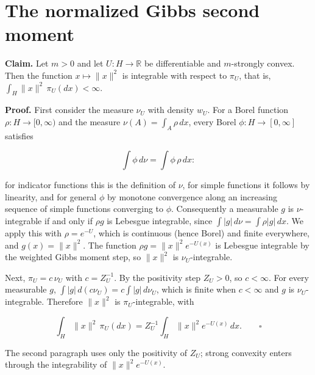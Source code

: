 \documentclass[11pt,a4paper]{article}
\begin{document}
\section{\texorpdfstring{The normalized Gibbs second moment}{The normalized Gibbs second moment}}


\textbf{Claim.} Let \(m>0\) and let \(U:H\to\mathbb R\) be differentiable and \(m\)-strongly convex. Then the function \(x\mapsto\|x\|^2\) is integrable with respect to \(\pi_U\), that is, \(\int_H\|x\|^2\,\pi_U(dx)<\infty\).




\textbf{Proof.} First consider the measure \(\nu_U\) with density \(w_U\). For a Borel function \(\rho:H\to[0,\infty)\) and the measure \(\nu(A)=\int_A\rho\,dx\), every Borel \(\phi:H\to[0,\infty]\) satisfies


\[\int\phi\,d\nu=\int\phi\,\rho\,dx:\]


for indicator functions this is the definition of \(\nu\), for simple functions it follows by linearity, and for general \(\phi\) by monotone convergence along an increasing sequence of simple functions converging to \(\phi\). Consequently a measurable \(g\) is \(\nu\)-integrable if and only if \(\rho g\) is Lebesgue integrable, since \(\int|g|\,d\nu=\int\rho|g|\,dx\). We apply this with \(\rho=e^{-U}\), which is continuous (hence Borel) and finite everywhere, and \(g(x)=\|x\|^2\). The function \(\rho g=\|x\|^2e^{-U(x)}\) is Lebesgue integrable by the weighted Gibbs moment step, so \(\|x\|^2\) is \(\nu_U\)-integrable.




Next, \(\pi_U=c\,\nu_U\) with \(c=Z_U^{-1}\). By the positivity step \(Z_U>0\), so \(c<\infty\). For every measurable \(g\), \(\int|g|\,d(c\nu_U)=c\int|g|\,d\nu_U\), which is finite when \(c<\infty\) and \(g\) is \(\nu_U\)-integrable. Therefore \(\|x\|^2\) is \(\pi_U\)-integrable, with


\[\int_H\|x\|^2\,\pi_U(dx)=Z_U^{-1}\int_H\|x\|^2e^{-U(x)}\,dx.\qquad\square\]


The second paragraph uses only the positivity of \(Z_U\); strong convexity enters through the integrability of \(\|x\|^2e^{-U(x)}\).
\end{document}
